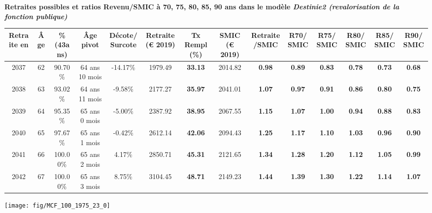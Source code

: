  \vspace{0.1cm} 
{\bf \noindent Retraites possibles et ratios Revenu/SMIC à 70, 75, 80, 85, 90 ans dans le modèle \emph{Destinie2 (revalorisation de la fonction publique)}}  
 
\begin{adjustbox}{max width=\textwidth} 
\begin{tabular}[htb]{|c|c||c|c|c||c|c||c|c||c|c|c|c|c|} 
\hline 
 Retraite en &  Âge &  \%(43ans) &  Âge pivot &  Décote/Surcote &  Retraite (\euro{} 2019) &  Tx Rempl(\%) &  SMIC (\euro{} 2019) &  Retraite/SMIC &  R70/SMIC &  R75/SMIC &  R80/SMIC &  R85/SMIC &  R90/SMIC \\ 
\hline \hline 
 2037 &  62 &  90.70\% &  64 ans 10 mois &  -14.17\% &  1979.49 &  {\bf 33.13} &  2014.82 &  {\bf {\color{red} 0.98}} &  {\bf {\color{red} 0.89}} &  {\bf {\color{red} 0.83}} &  {\bf {\color{red} 0.78}} &  {\bf {\color{red} 0.73}} &  {\bf {\color{red} 0.68}} \\ 
\hline 
 2038 &  63 &  93.02\% &  64 ans 11 mois &  -9.58\% &  2177.27 &  {\bf 35.97} &  2041.01 &  {\bf 1.07} &  {\bf {\color{red} 0.97}} &  {\bf {\color{red} 0.91}} &  {\bf {\color{red} 0.86}} &  {\bf {\color{red} 0.80}} &  {\bf {\color{red} 0.75}} \\ 
\hline 
 2039 &  64 &  95.35\% &  65 ans 0 mois &  -5.00\% &  2387.92 &  {\bf 38.95} &  2067.55 &  {\bf 1.15} &  {\bf 1.07} &  {\bf 1.00} &  {\bf {\color{red} 0.94}} &  {\bf {\color{red} 0.88}} &  {\bf {\color{red} 0.83}} \\ 
\hline 
 2040 &  65 &  97.67\% &  65 ans 1 mois &  -0.42\% &  2612.14 &  {\bf 42.06} &  2094.43 &  {\bf 1.25} &  {\bf 1.17} &  {\bf 1.10} &  {\bf 1.03} &  {\bf {\color{red} 0.96}} &  {\bf {\color{red} 0.90}} \\ 
\hline 
 2041 &  66 &  100.00\% &  65 ans 2 mois &  4.17\% &  2850.71 &  {\bf 45.31} &  2121.65 &  {\bf 1.34} &  {\bf 1.28} &  {\bf 1.20} &  {\bf 1.12} &  {\bf 1.05} &  {\bf {\color{red} 0.99}} \\ 
\hline 
 2042 &  67 &  100.00\% &  65 ans 3 mois &  8.75\% &  3104.45 &  {\bf 48.71} &  2149.23 &  {\bf 1.44} &  {\bf 1.39} &  {\bf 1.30} &  {\bf 1.22} &  {\bf 1.14} &  {\bf 1.07} \\ 
\hline 
\hline 
\end{tabular} 
\end{adjustbox} 
 
 \vspace{0.1cm} 

 {\hspace{-2.2cm}\texttt{[image: fig/MCF\_100\_1975\_23\_0]}} 

